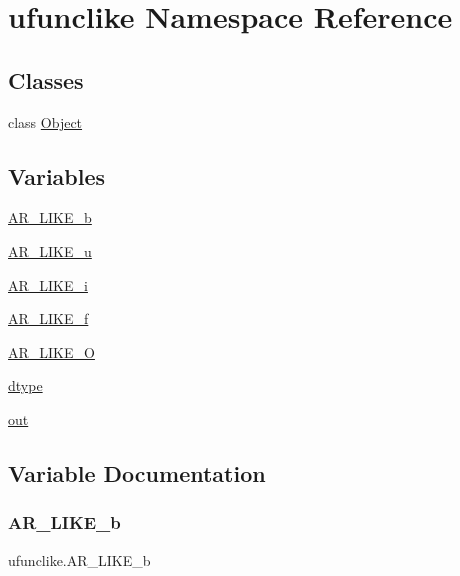 \hypertarget{namespaceufunclike}{}\section{ufunclike Namespace Reference}
\label{namespaceufunclike}
\subsection*{Classes}
\begin{DoxyCompactItemize}
\item 
class \hyperlink{classufunclike_1_1Object}{Object}
\end{DoxyCompactItemize}
\subsection*{Variables}
\begin{DoxyCompactItemize}
\item 
\hyperlink{namespaceufunclike_accb2a673d0e190495e0e95105b27b153}{A\+R\+\_\+\+L\+I\+K\+E\+\_\+b}
\item 
\hyperlink{namespaceufunclike_ac1537a646143d4380b95792b48a5d335}{A\+R\+\_\+\+L\+I\+K\+E\+\_\+u}
\item 
\hyperlink{namespaceufunclike_a0ec7c695a7e6ce3c46427413a7e70aff}{A\+R\+\_\+\+L\+I\+K\+E\+\_\+i}
\item 
\hyperlink{namespaceufunclike_ae89cbdfa998487d0aadea5665c32b3a8}{A\+R\+\_\+\+L\+I\+K\+E\+\_\+f}
\item 
\hyperlink{namespaceufunclike_a25b2ead4b6b77584c87b8e5c23f785d3}{A\+R\+\_\+\+L\+I\+K\+E\+\_\+O}
\item 
\hyperlink{namespaceufunclike_a32389558d3b36dcb1273d6d56cd9301d}{dtype}
\item 
\hyperlink{namespaceufunclike_abe90743ea551dce5d6818f47ecf89547}{out}
\end{DoxyCompactItemize}


\subsection{Variable Documentation}
\mbox{\label{namespaceufunclike_accb2a673d0e190495e0e95105b27b153}} 
\subsubsection{\texorpdfstring{A\+R\+\_\+\+L\+I\+K\+E\+\_\+b}{AR\_LIKE\_b}}
{\footnotesize\ttfamily ufunclike.\+A\+R\+\_\+\+L\+I\+K\+E\+\_\+b}

